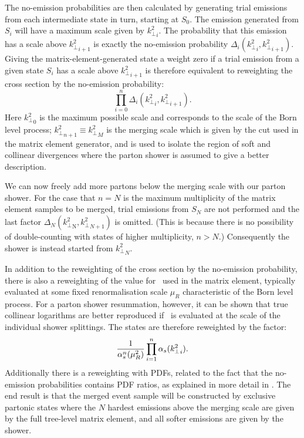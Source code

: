 The no-emission probabilities are then
calculated by generating trial emissions from each intermediate state in turn, starting at
$S_0$. The emission generated from $S_i$ will have a maximum
scale given by ${k^2_\perp}_i$. The probability that this emission has a
scale above ${k^2_\perp}_{i+1}$ is exactly the no-emission probability
$\Delta_i({k^2_\perp}_i,{k^2_\perp}_{i+1})$. Giving the
matrix-element-generated state a weight zero if a trial
emission from a given state $S_i$ has a scale above ${k^2_\perp}_{i+1}$
is therefore equivalent to reweighting the cross
section by the no-emission probability:
\begin{equation}
  \label{eq:noem}
  \prod_{i=0}^n\Delta_i({k^2_\perp}_i,{k^2_\perp}_{i+1}).
\end{equation}
Here ${k^2_\perp}_0 $ is the maximum possible
scale and corresponds to the scale of the Born level process; ${k^2_\perp}_{n+1}\equiv {k^2_\perp}_M$ is the merging
scale which is given by the cut used in the matrix element
generator, and is used to isolate the region of soft and collinear divergences
where the parton shower is assumed to give a better description.

We can now freely add more partons below the merging scale with our
parton shower.  For the case that $n=N$ is the maximum multiplicity of
the matrix element samples to be merged, trial emissions from $S_N$
are not performed and the last factor
$\Delta_N({k^2_\perp}_\mathrm{N},{k^2_\perp}_{N+1})$ is omitted. (This
is because there is no possibility of double-counting with states of
higher multiplicity, $n>N$.)  Consequently the shower is instead
started from ${k^2_\perp}_N$.

In addition to the reweighting of the cross section by the no-emission probability,
there is also a reweighting of the value for \as\ used in the matrix element,
typically evaluated at some fixed renormalisation scale $\mu_R$ characteristic of the Born level process. For a parton
shower resummation, however, it can be shown that true collinear
logarithms are better reproduced if \as\ is evaluated at the
scale of the individual shower splittings. The states
are therefore reweighted by the factor: 
\begin{equation}
\frac{1}{\alpha_s^n(\mu_R^2)}\prod_{i=1}^n \alpha_s({k^2_\perp}_i).
\label{eq:alpharew}
\end{equation}
Additionally there is a reweighting with PDFs,
related to the fact that the no-emission probabilities contains PDF
ratios, as explained in more detail in \cite{Lavesson:2005xu}.
The end result is that the merged event sample will be constructed by
exclusive partonic states where the $N$ hardest emissions above the
merging scale are given by the full tree-level matrix element, and all
softer emissions are given by the shower.

